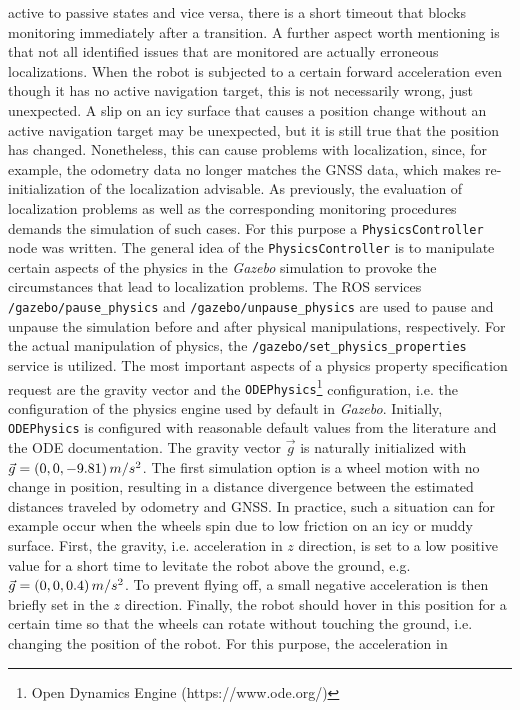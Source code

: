 \documentclass[english, master, utf8]{base/thesis_KBS}
\newcommand{\code}[1]{\colorbox{light-gray}{\texttt{#1}}}
\begin{document}
active to passive states and vice versa, there is a short timeout that blocks monitoring immediately after a transition. A further aspect worth mentioning is that not all identified
issues that are monitored are actually erroneous localizations. When the robot is subjected to a certain forward acceleration even though it has no active navigation target, this is
not necessarily wrong, just unexpected. A slip on an icy surface that causes a position change without an active navigation target may be unexpected, but it is still true that the
position has changed. Nonetheless, this can cause problems with localization, since, for example, the odometry data no longer matches the GNSS data, which makes re-initialization of
the localization advisable.\newline
As previously, the evaluation of localization problems as well as the corresponding monitoring procedures demands the simulation of such cases. For this purpose a
\code{PhysicsController} node was written. The general idea of the \code{PhysicsController} is to manipulate certain aspects of the physics in the \textit{Gazebo} simulation to
provoke the circumstances that lead to localization problems. The ROS services \code{/gazebo/pause\_physics} and \code{/gazebo/unpause\_physics} are used to pause and unpause the
simulation before and after physical manipulations, respectively. For the actual manipulation of physics, the \code{/gazebo/set\_physics\_properties} service is utilized. The most
important aspects of a physics property specification request are the gravity vector and the \code{ODEPhysics}\footnote{Open Dynamics Engine (https://www.ode.org/)} configuration,
i.e. the configuration of the physics engine used by default in \textit{Gazebo}. Initially, \code{ODEPhysics} is configured with reasonable default values from the literature and the
ODE documentation. The gravity vector $\vec{g}$ is naturally initialized with $\vec{g} = (0, 0, -9.81) \thinspace m/s^2$. The first simulation option is a wheel motion with no change
in position, resulting in a distance divergence between the estimated distances traveled by odometry and GNSS. In practice, such a situation can for example occur when the wheels spin
due to low friction on an icy or muddy surface. First, the gravity, i.e. acceleration in $z$ direction, is set to a low positive value for a short time to levitate the robot above
the ground, e.g. $\vec{g} = (0, 0, 0.4) \thinspace m/s^2$. To prevent flying off, a small negative acceleration is then briefly set in the $z$ direction. Finally, the robot should
hover in this position for a certain time so that the wheels can rotate without touching the ground, i.e. changing the position of the robot. For this purpose, the acceleration in
\end{document}
